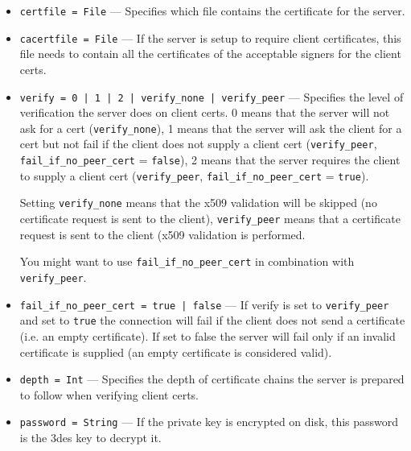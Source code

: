 \documentclass[11pt,oneside,english]{book}
\begin{document}
\begin{itemize}
\begin{itemize}
\item        \verb+certfile = File+ ---
              Specifies which file contains  the  certificate for the server.

\item        \verb+cacertfile = File+ ---
              If  the  server  is  setup  to require
              client certificates, this file needs to contain
              all the certificates of the acceptable
              signers for the client certs.

\item        \verb+verify = 0 | 1 | 2 | verify_none | verify_peer+
              --- Specifies the level of verification the server does
              on client certs. 0 means that the server will not
              ask for a cert (\verb+verify_none+), 1 means that
              the server will ask the client for a cert but not
              fail if the client does not supply a client cert
              (\verb+verify_peer+, \verb+fail_if_no_peer_cert+
              = \verb+false+), 2 means that the server requires
              the client to supply a client cert
              (\verb+verify_peer+, \verb+fail_if_no_peer_cert+ =
              \verb+true+).

              Setting \verb+verify_none+ means that the x509
              validation will be skipped (no certificate request
              is sent to the client), \verb+verify_peer+ means
              that a certificate request is sent to the client
              (x509 validation is performed.

              You might want to use \verb+fail_if_no_peer_cert+
              in combination with \verb+verify_peer+.

\item        \verb+fail_if_no_peer_cert = true | false+ ---
              If verify is set to \verb+verify_peer+ and set
              to \verb+true+ the connection will fail if the
              client does not send a certificate (i.e. an empty
              certificate). If set to false the server will
              fail only if an invalid certificate is supplied
              (an empty certificate is considered valid).

\item        \verb+depth = Int+ ---
              Specifies the depth  of  certificate  chains
              the  server is prepared to follow when verifying
              client certs.

\item        \verb+password = String+ ---
              If the private key  is  encrypted  on
              disk,  this  password  is  the  3des  key to
              decrypt it.


\end{itemize}
\end{itemize}
\end{document}
